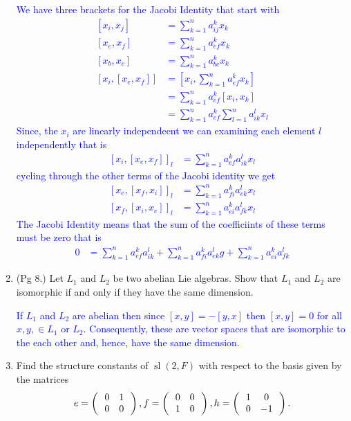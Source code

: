 \documentclass[12pt,a4paper]{report}
\newcommand{\BLUE}[1]{\textcolor{blue}{#1}}
\newcommand{\SL}{\operatorname{sl}}
\newcommand{\LB}[2]{\left [ #1,#2 \right ]}
\begin{document}
\begin{enumerate}[label=\textit{1.\arabic*}]
\BLUE{We have three brackets for the Jacobi Identity that start with 
\begin{align*}
	\LB{x_i}{x_j} &= \sum_{k=1}^n a_{ij}^k x_k\\
	\LB{x_e}{x_f} &= \sum_{k=1}^n a_{ef}^k x_k\\
	\LB{x_b}{x_c} &= \sum_{k=1}^n a_{bc}^k x_k\\
	\LB{x_i}{\LB{x_e}{x_f}} &= \LB{x_i}{\sum_{k=1}^n a_{ef}^k x_k}\\
	&= \sum_{k=1}^n a_{ef}^k\LB{x_i}{ x_k}\\
	&= \sum_{k=1}^n a_{ef}^k\sum_{l=1}^n a_{ik}^l x_l
\end{align*}Since, the $x_i$ are linearly independeent we can examining each element $l$ independently that is 
\begin{align*}
	\LB{x_i}{\LB{x_e}{x_f}}_l &= \sum_{k=1}^n a_{ef}^ka_{ik}^l x_l
\end{align*}cycling through the other terms of the Jacobi identity we get
\begin{align*}
	\LB{x_e}{\LB{x_f}{x_i}}_l &= \sum_{k=1}^n a_{fi}^ka_{ek}^l x_l\\
	\LB{x_f}{\LB{x_i}{x_e}}_l &= \sum_{k=1}^n a_{ei}^ka_{fk}^l x_l
\end{align*}The Jacobi Identity means that the sum of the coefficiints of these terms must be zero that is
\begin{align*}
	0 &= \sum_{k=1}^n a_{ef}^ka_{ik}^l + \sum_{k=1}^n a_{fi}^ka_{ek}^lg+\sum_{k=1}^n a_{ei}^ka_{fk}^l
\end{align*}
}

\item (Pg 8.) Let $L_1$ and $L_2$ be two abelian Lie algebras.  Show that $L_1$ and $L_2$ are isomorphic if and only if they have the same dimension.

\BLUE{If $L_1$ and $L_2$ are abelian then since $[x,y] = -[y,x]$ then $[x,y]=0$ for all $x,y, \in L_1$ or $L_2$.  Consequently, these are vector spaces that are isomorphic to the each other and, hence, have the same dimension.
}

\item Find the structure constants of $\SL(2,F)$ with respect to the basis given by the matrices
\begin{align*}
	e=\left (\,  \begin{array}{c c} 0&1 \\ 0 & 0 \end{array}  \,\right ),f=\left (\,  \begin{array}{c c} 0&0 \\ 1 & 0 \end{array}  \,\right ), h=\left (\,  \begin{array}{c c} 1&0 \\ 0 & -1 \end{array}  \,\right ).
\end{align*}


\end{enumerate}
\end{document}
